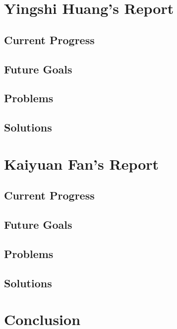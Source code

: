\documentclass[onecolumn, draftclsnofoot,10pt, compsoc]{IEEEtran}
\begin{document}
\section{Yingshi Huang's Report}

\subsection{Current Progress}

\subsection{Future Goals}

\subsection{Problems}

\subsection{Solutions}





\section{Kaiyuan Fan's Report}

\subsection{Current Progress}

\subsection{Future Goals}

\subsection{Problems}

\subsection{Solutions}








\section{Conclusion}






\end{document}
